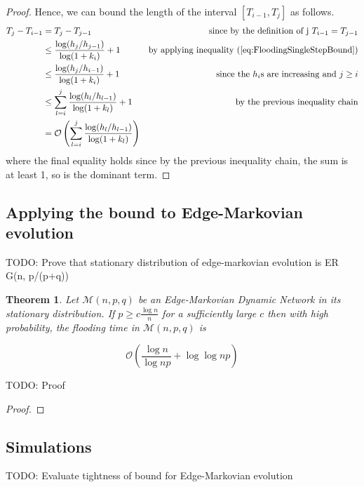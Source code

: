 \documentclass[a4paper,11pt]{article}
\newtheorem{theorem}{Theorem}[section]
\theoremstyle{definition}
\begin{document}
\begin{proof}
	Hence, we can bound the length of the interval $[T_{i-1}, T_j]$ as follows.
	\begin{align*}
		T_j - T_{i-1} &= T_j - T_{j-1} & \text{since by the definition of j } T_{i-1} = T_{j-1}\\
		& \leq \frac{\log (h_j/h_{j-1})}{\log(1+k_i)} + 1 & \text{by applying inequality }(\ref{eq:FloodingSingleStepBound}) \\
		& \leq \frac{\log (h_j/h_{i-1})}{\log(1+k_i)} + 1 & \text{since the } h_i \text{s are increasing and } j \geq i \\
		& \leq \sum_{l=i}^j \frac{\log (h_{l}/h_{l-1})}{\log(1+k_l) } + 1 & \text{ by the previous inequality chain} \\
		& = \mathcal{O}\left(\sum_{l=i}^j \frac{\log (h_{l}/h_{l-1})}{\log(1+k_l) }\right)
 	\end{align*}
	where the final equality holds since by the previous inequality chain, the sum is at least 1, so is the dominant term.
\end{proof}

\subsection{Applying the bound to Edge-Markovian evolution}

TODO: Prove that stationary distribution of edge-markovian evolution is ER G(n, p/(p+q))

\begin{theorem}
	Let $\mathcal{M}(n, p, q)$ be an Edge-Markovian Dynamic Network in its stationary distribution. If $p \geq c \frac{\log n}{n}$ for a sufficiently large $c$ then with high probability, the flooding time in $\mathcal{M}(n, p, q)$ is 

	$$
		\mathcal{O}\left(\frac{\log n}{\log np} + \log \log np \right)
	$$
\end{theorem}

TODO: Proof

\begin{proof}
	
\end{proof}


\subsection{Simulations}

TODO: Evaluate tightness of bound for Edge-Markovian evolution
\end{document}
